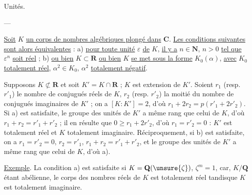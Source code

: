 
\begin{center}Unités.

---\end{center}

\uline{Soit} $K$ \uline{un corps de nombres algébriques plongé dans} $\mathbf C$. \uline{Les conditions suivantes sont alors équivalentes} : a) \uline{pour toute unité} $\varepsilon$ \uline{de} $K$, \uline{il y a} $n\in\mathbf N$, $n>0$ \uline{tel que} $\varepsilon^n$ \uline{soit réel} ; b)  \uline{ou bien} $K\subset\mathbf R$ \uline{ou bien} $K$ \uline{se met sous la forme} $K_0(\alpha)$, \uline{avec} $K_0$ \uline{totalement réel}, $\alpha^2\in K_0$, $\alpha^2$ \uline{totalement négatif}.

Supposons $K\not\subset\mathbf R$ et soit $K'=K\cap\mathbf R$ ; $K$ est extension   de $K'$. Soient $r_1$ (resp. $r'_1$) le nombre de conjugués réels de $K$, $r_2$ (resp. $r'_2$) la moitié du nombre de conjugués imaginaires de $K'$ ; on a $[K:K']=2$, d'où $r_1+2r_2=p(r'_1+2r'_2)$. Si a) est satisfaite, le groupe des unités de $K'$ a même rang que celui de $K$, d'où  $r_1+r_2=r'_1+r'_2$ ; il en résulte que $0\geq r_1+2r'_2$, d'où $r_1=r'_2=0$ : $K'$ est totalement réel et $K$ totalement imaginaire. Réciproquement, si b) est satisfaite, on a $r_1=r'_2=0$, $r_2=r'_1$, $r_1+r_2=r'_1+r'_2$, et le groupe des unités de $K'$ a même rang que celui de $K$, d'où a).

\uline{Exemple}. La condition a) est satisfaite si $K=\mathbf Q(\unsure{\zeta})$, $\zeta^m=1$, car, $K/\mathbf Q$ étant abélienne, le corps des nombres réels de $K$ est totalement réel tandisque $K$ est totalement imaginaire.

